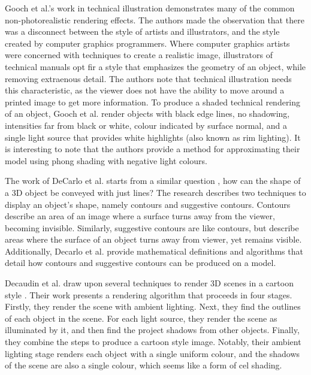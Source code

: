 Gooch et al.'s work in technical illustration demonstrates many of the common 
non-photorealistic rendering effects. The authors made the observation that there was a 
disconnect between the style of artists and illustrators, and the style created by computer 
graphics programmers. Where computer graphics artists were concerned with techniques to 
create a realistic image, illustrators of technical manuals opt fir a style that emphasizes
the geometry of an object, while removing extraenous detail. The authors note that technical
illustration needs this characteristic, as the viewer does not have the ability to move
around a printed image to get more information. To produce a shaded technical rendering of
an object, Gooch et al. render objects with black edge lines, no shadowing, intensities far 
from black or white, colour indicated by surface normal, and a single light source that 
provides white highlights (also known as rim lighting). It is interesting to note that the 
authors provide a method for approximating their model using phong shading with negative 
light colours.

The work of DeCarlo et al. starts from a similar question \cite{decarlo03}, how can the shape 
of a 3D object be conveyed with just lines? The research describes two techniques to display 
an object's shape, namely contours and suggestive contours. Contours describe an area of an 
image where a surface turns away from the viewer, becoming invisible. Similarly, suggestive
contours are like contours, but describe areas where the surface of an object turns away from
viewer, yet remains visible. Additionally, Decarlo et al. provide mathematical definitions
and algorithms that detail how contours and suggestive contours can be produced on a model.

Decaudin et al. draw upon several techniques to render 3D scenes in a cartoon style 
\cite{decaudin96}. Their work presents a rendering algorithm that proceeds in four stages. 
Firstly, they render the scene with ambient lighting. Next, they find the outlines of each 
object in the scene. For each light source, they render the scene as illuminated by it, and 
then find the project shadows from other objects. Finally, they combine the steps to produce 
a cartoon style image. Notably, their ambient lighting stage renders each object with a 
single uniform colour, and the shadows of the scene are also a single colour, which seems 
like a form of cel shading.